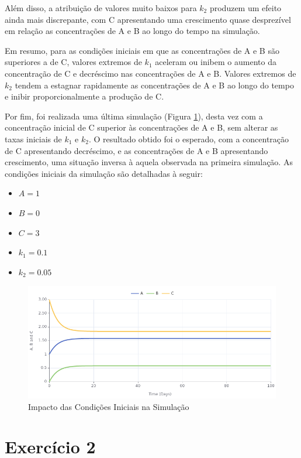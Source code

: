 \documentclass[a4paper, 12pt]{article}
\begin{document}
Além disso, a atribuição de valores muito baixos para \(k_2\) produzem um efeito ainda mais discrepante, com C apresentando uma crescimento quase desprezível em relação as concentrações de A e B ao longo do tempo na simulação.

Em resumo, para as condições iniciais em que as concentrações de A e B são superiores a de C, valores extremos de \(k_1\) aceleram ou inibem o aumento da concentração de C e decréscimo nas concentrações de A e B. Valores extremos de \(k_2\) tendem a estagnar rapidamente as concentrações de A e B ao longo do tempo e inibir proporcionalmente a produção de C.

Por fim, foi realizada uma última simulação (Figura \ref{fig:exampleFig5}), desta vez com a concentração inicial de C superior às concentrações de A e B, sem alterar as taxas iniciais de \(k_1\) e \(k_2\). O resultado obtido foi o esperado, com a concentração de C apresentando decréscimo, e as concentrações de A e B apresentando crescimento, uma situação inversa à aquela observada na primeira simulação. As condições iniciais da simulação são detalhadas à seguir:

\begin{itemize}
    \item \(A = 1\)
    \item \(B = 0\)
    \item \(C = 3\)
    \item \(k_1 = 0.1\)
    \item \(k_2 = 0.05\)
\end{itemize}

\begin{figure}[H]
    \centering
    \includegraphics[width=1\textwidth]{Images/Exercise 1/c.png}
    \caption{Impacto das Condições Iniciais na Simulação}
    \label{fig:exampleFig5}
\end{figure}

\section*{Exercício 2}
\end{document}
